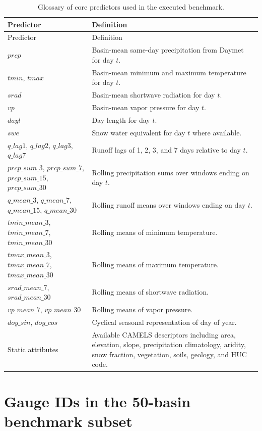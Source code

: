 \documentclass[preprint,12pt,authoryear]{elsarticle}
\begin{document}
\begin{longtable}{p{}p{}}
\caption{Glossary of core predictors used in the executed benchmark.}\label{tab:glossary}\\
\toprule
Predictor & Definition \\
\midrule
\endfirsthead
\toprule
Predictor & Definition \\
\midrule
\endhead
\bottomrule
\endfoot
$prcp$ & Basin-mean same-day precipitation from Daymet for day $t$. \\
$tmin$, $tmax$ & Basin-mean minimum and maximum temperature for day $t$. \\
$srad$ & Basin-mean shortwave radiation for day $t$. \\
$vp$ & Basin-mean vapor pressure for day $t$. \\
$dayl$ & Day length for day $t$. \\
$swe$ & Snow water equivalent for day $t$ where available. \\
$q\_lag1$, $q\_lag2$, $q\_lag3$, $q\_lag7$ & Runoff lags of 1, 2, 3, and 7 days relative to day $t$. \\
$prcp\_sum\_3$, $prcp\_sum\_7$, $prcp\_sum\_15$, $prcp\_sum\_30$ & Rolling precipitation sums over windows ending on day $t$. \\
$q\_mean\_3$, $q\_mean\_7$, $q\_mean\_15$, $q\_mean\_30$ & Rolling runoff means over windows ending on day $t$. \\
$tmin\_mean\_3$, $tmin\_mean\_7$, $tmin\_mean\_30$ & Rolling means of minimum temperature. \\
$tmax\_mean\_3$, $tmax\_mean\_7$, $tmax\_mean\_30$ & Rolling means of maximum temperature. \\
$srad\_mean\_7$, $srad\_mean\_30$ & Rolling means of shortwave radiation. \\
$vp\_mean\_7$, $vp\_mean\_30$ & Rolling means of vapor pressure. \\
$doy\_sin$, $doy\_cos$ & Cyclical seasonal representation of day of year. \\
Static attributes & Available CAMELS descriptors including area, elevation, slope, precipitation climatology, aridity, snow fraction, vegetation, soils, geology, and HUC code. \\
\end{longtable}

\section{Gauge IDs in the 50-basin benchmark subset}
\end{document}
